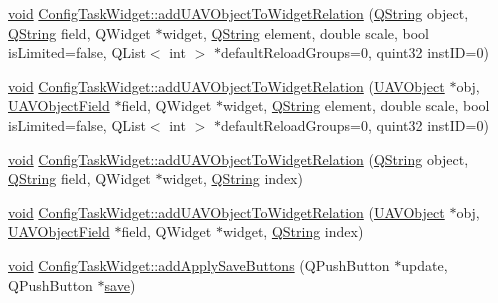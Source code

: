 \begin{DoxyCompactItemize}
\item 
\hyperlink{group___u_a_v_objects_plugin_ga444cf2ff3f0ecbe028adce838d373f5c}{void} \hyperlink{group___u_a_v_object_widget_utils_ga929ce6a70bab7ab756f3d7df22ee4427}{\-Config\-Task\-Widget\-::add\-U\-A\-V\-Object\-To\-Widget\-Relation} (\hyperlink{group___u_a_v_objects_plugin_gab9d252f49c333c94a72f97ce3105a32d}{\-Q\-String} object, \hyperlink{group___u_a_v_objects_plugin_gab9d252f49c333c94a72f97ce3105a32d}{\-Q\-String} field, \-Q\-Widget $\ast$widget, \hyperlink{group___u_a_v_objects_plugin_gab9d252f49c333c94a72f97ce3105a32d}{\-Q\-String} element, double scale, bool is\-Limited=false, \-Q\-List$<$ int $>$ $\ast$default\-Reload\-Groups=0, quint32 inst\-I\-D=0)
\item 
\hyperlink{group___u_a_v_objects_plugin_ga444cf2ff3f0ecbe028adce838d373f5c}{void} \hyperlink{group___u_a_v_object_widget_utils_ga70ea9dedfc9c692d10fd0c2223336ff6}{\-Config\-Task\-Widget\-::add\-U\-A\-V\-Object\-To\-Widget\-Relation} (\hyperlink{class_u_a_v_object}{\-U\-A\-V\-Object} $\ast$obj, \hyperlink{class_u_a_v_object_field}{\-U\-A\-V\-Object\-Field} $\ast$field, \-Q\-Widget $\ast$widget, \hyperlink{group___u_a_v_objects_plugin_gab9d252f49c333c94a72f97ce3105a32d}{\-Q\-String} element, double scale, bool is\-Limited=false, \-Q\-List$<$ int $>$ $\ast$default\-Reload\-Groups=0, quint32 inst\-I\-D=0)
\item 
\hyperlink{group___u_a_v_objects_plugin_ga444cf2ff3f0ecbe028adce838d373f5c}{void} \hyperlink{group___u_a_v_object_widget_utils_gae3ae5288613fb8062c029d9a4da6c759}{\-Config\-Task\-Widget\-::add\-U\-A\-V\-Object\-To\-Widget\-Relation} (\hyperlink{group___u_a_v_objects_plugin_gab9d252f49c333c94a72f97ce3105a32d}{\-Q\-String} object, \hyperlink{group___u_a_v_objects_plugin_gab9d252f49c333c94a72f97ce3105a32d}{\-Q\-String} field, \-Q\-Widget $\ast$widget, \hyperlink{group___u_a_v_objects_plugin_gab9d252f49c333c94a72f97ce3105a32d}{\-Q\-String} index)
\item 
\hyperlink{group___u_a_v_objects_plugin_ga444cf2ff3f0ecbe028adce838d373f5c}{void} \hyperlink{group___u_a_v_object_widget_utils_ga368867adfb58200a5f6af90141e8f1ae}{\-Config\-Task\-Widget\-::add\-U\-A\-V\-Object\-To\-Widget\-Relation} (\hyperlink{class_u_a_v_object}{\-U\-A\-V\-Object} $\ast$obj, \hyperlink{class_u_a_v_object_field}{\-U\-A\-V\-Object\-Field} $\ast$field, \-Q\-Widget $\ast$widget, \hyperlink{group___u_a_v_objects_plugin_gab9d252f49c333c94a72f97ce3105a32d}{\-Q\-String} index)
\item 
\hyperlink{group___u_a_v_objects_plugin_ga444cf2ff3f0ecbe028adce838d373f5c}{void} \hyperlink{group___u_a_v_object_widget_utils_ga38c270f9a29f4e190e71414bdce82590}{\-Config\-Task\-Widget\-::add\-Apply\-Save\-Buttons} (\-Q\-Push\-Button $\ast$update, \-Q\-Push\-Button $\ast$\hyperlink{uavobjecttemplate_8m_a79178933c5b76091ca04178d14a5ba98}{save})

\end{DoxyCompactItemize}

